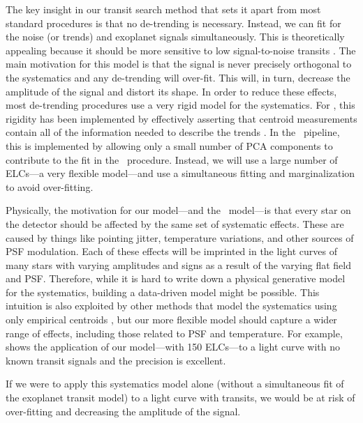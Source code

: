 The key insight in our transit search method that sets it apart from most
standard procedures is that no de-trending is necessary.
Instead, we can fit for the noise (or trends) and exoplanet signals
simultaneously.
This is theoretically appealing because it should be more sensitive to low
signal-to-noise transits .
The main motivation for this model is that the signal is never precisely
orthogonal to the systematics and any de-trending will over-fit.
This will, in turn, decrease the amplitude of the signal and distort its
shape.
In order to reduce these effects, most de-trending procedures use a very rigid
model for the systematics.
For \KT, this rigidity has been implemented by effectively asserting that
centroid measurements contain all of the information needed to describe the
trends \citep{Vanderburg:2014, Aigrain:2015, Crossfield:2015}.
In the \kepler\ pipeline, this is implemented by allowing only a small number
of PCA components to contribute to the fit in the \pdc\ procedure.
Instead, we will use a large number of ELCs---a very flexible model---and use
a simultaneous fitting and marginalization to avoid over-fitting.

Physically, the motivation for our model---and the \pdc\ model---is that every
star on the detector should be affected by the same set of systematic effects.
These are caused by things like pointing jitter, temperature variations, and
other sources of PSF modulation.
Each of these effects will be imprinted in the light curves of many stars with
varying amplitudes and signs as a result of the varying flat field and PSF.
Therefore, while it is hard to write down a physical generative model for the
systematics, building a data-driven model might be possible.
This intuition is also exploited by other methods that model the systematics
using only empirical centroids \citep{Vanderburg:2014, Armstrong:2014,
Aigrain:2015, Crossfield:2015}, but our more flexible model should capture a
wider range of effects, including those related to PSF and temperature.
For example,  shows the application of our model---with 150
ELCs---to a light curve with no known transit signals and the precision is
excellent.

If we were to apply this systematics model alone (without a simultaneous fit
of the exoplanet transit model) to a light curve with transits, we would be at
risk of over-fitting and decreasing the amplitude of the signal.

